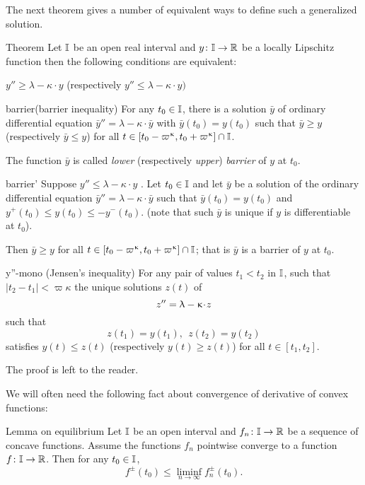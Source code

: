 The next theorem gives a  number of equivalent ways to define such a generalized solution.

\begin{thm}{Theorem}\label{y''=<1-ky}
Let $\mathbb{I}$ be an open real interval and $y\:\II\to\RR$ be a locally Lipschitz function
then the following conditions are equivalent:
\begin{subthm}{}$y''\ge \lambda-\kappa\cdot  y$ (respectively $y''\le \lambda-\kappa\cdot  y)$
\end{subthm}

\begin{subthm}{barrier}(barrier inequality) For any $t_0\in \II$, 
there is a solution $\bar y$ 
of ordinary differential equation $\bar y''=\lambda-\kappa\cdot  \bar y$ 
with $\bar y(t_0)= y(t_0)$ such that $\bar y\ge y$ (respectively $\bar y\le y$) for all $t\in [t_0-\varpi\kappa,t_0+\varpi\kappa]\cap \II$.

The function $\bar y$ is called \emph{lower} (respectively \emph{upper}) \emph{barrier} of $y$ at $t_0$.
\end{subthm}

\begin{subthm}{barrier'} 
Suppose $y''\le \lambda-\kappa\cdot  y$ . Let $t_0\in\II$ and let  $\bar y$ be a solution of  the
 ordinary differential equation $\bar y''=\lambda-\kappa\cdot  \bar y$ 
such that  $\bar y(t_0)= y(t_0)$ and $y^+(t_0)\le y(t_0)\le -y^-(t_0)$. (note that such $\bar{y}$ is unique if $y$ is differentiable at $t_0$). 

Then $\bar y\ge y$  for all $t\in [t_0-\varpi\kappa,t_0+\varpi\kappa]\cap \II$; that is $\bar{y}$ is a barrier of $y$ at $t_0$.
\end{subthm}

\begin{subthm}{y''-mono} (Jensen's inequality)
For any pair of values $t_1<t_2$ in $\mathbb{I}$, such that $|t_2-t_1|<\varpi\kappa$ the unique solutions $z(t)$ of \[z''\z=\lambda-\kappa\cdot  z\] such that
\[z(t_1)=y(t_1),\ \ z(t_2)=y(t_2)\] 
satisfies $y(t)\le z(t)$ (respectively $y(t)\ge z(t)$) for all $t\in[t_1,t_2]$.
\end{subthm}
\end{thm}

The proof is left to the reader.

We will often need the following fact about convergence of derivative of convex functions:

{\sloppy 

\begin{thm}{Lemma on equilibrium}\label{lem:der-conv-lim}
Let $\mathbb{I}$ be an open interval 
and $f_n\:\II\to\RR$ be a sequence of concave functions. 
Assume the functions $f_n$ pointwise converge to a function $f\:\II\to\RR$.
Then for any $t_0\in \II$,
\[f^\pm(t_0)\le \liminf_{n\to\infty}f^\pm_n(t_0).\]
\end{thm}

}

